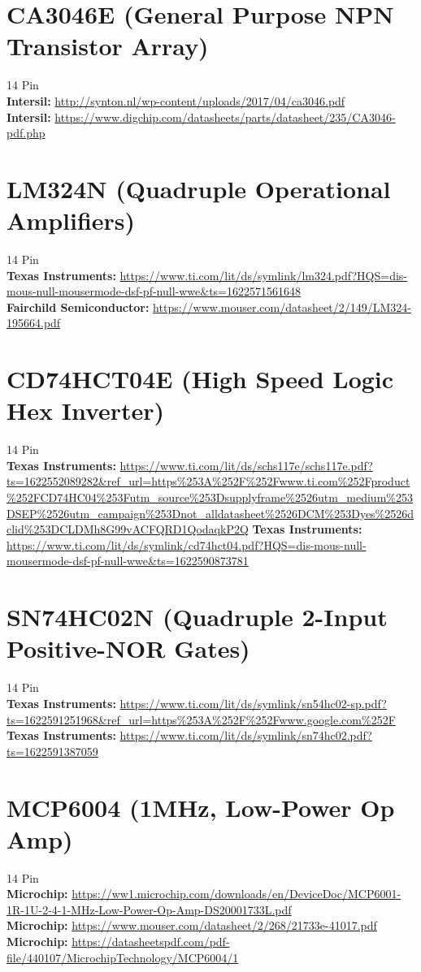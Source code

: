 \documentclass[10pt, letterpaper]{article}
\begin{document}
\section{CA3046E (General Purpose NPN Transistor Array)}
14 Pin\\
\textbf{Intersil: } \url{http://synton.nl/wp-content/uploads/2017/04/ca3046.pdf}\\
\textbf{Intersil: } \url{https://www.digchip.com/datasheets/parts/datasheet/235/CA3046-pdf.php}

\section{LM324N (Quadruple Operational Amplifiers)}
14 Pin\\
\textbf{Texas Instruments: } \url{https://www.ti.com/lit/ds/symlink/lm324.pdf?HQS=dis-mous-null-mousermode-dsf-pf-null-wwe&ts=1622571561648}\\
\textbf{Fairchild Semiconductor: } \url{https://www.mouser.com/datasheet/2/149/LM324-195664.pdf}

\section{CD74HCT04E (High Speed Logic Hex Inverter)}
14 Pin\\
\textbf{Texas Instruments: } \url{https://www.ti.com/lit/ds/schs117e/schs117e.pdf?ts=1622552089282&ref_url=https%253A%252F%252Fwww.ti.com%252Fproduct%252FCD74HC04%253Futm_source%253Dsupplyframe%2526utm_medium%253DSEP%2526utm_campaign%253Dnot_alldatasheet%2526DCM%253Dyes%2526dclid%253DCLDMh8G99vACFQRD1QodaqkP2Q}
\textbf{Texas Instruments: } \url{https://www.ti.com/lit/ds/symlink/cd74hct04.pdf?HQS=dis-mous-null-mousermode-dsf-pf-null-wwe&ts=1622590873781}

\section{SN74HC02N (Quadruple 2-Input Positive-NOR Gates)}
14 Pin\\
\textbf{Texas Instruments: } \url{https://www.ti.com/lit/ds/symlink/sn54hc02-sp.pdf?ts=1622591251968&ref_url=https%253A%252F%252Fwww.google.com%252F}\\
\textbf{Texas Instruments: } \url{https://www.ti.com/lit/ds/symlink/sn74hc02.pdf?ts=1622591387059}

\section{MCP6004 (1MHz, Low-Power Op Amp)}
14 Pin\\
\textbf{Microchip: } \url{https://ww1.microchip.com/downloads/en/DeviceDoc/MCP6001-1R-1U-2-4-1-MHz-Low-Power-Op-Amp-DS20001733L.pdf}\\
\textbf{Microchip: } \url{https://www.mouser.com/datasheet/2/268/21733e-41017.pdf}\\
\textbf{Microchip: } \url{https://datasheetspdf.com/pdf-file/440107/MicrochipTechnology/MCP6004/1}
\end{document}
